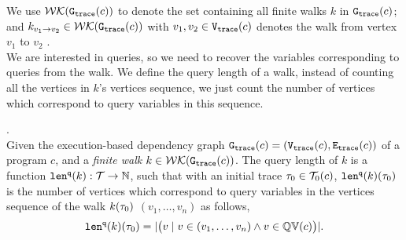 We use $\mathcal{WK}(\mathtt{{G_{trace}}}(c))$ to denote 
the set containing all finite walks $k$ in $\mathtt{{G_{trace}}}(c)$;
and $k_{v_1 \to v_2} \in \mathcal{WK}(\mathtt{{G_{trace}}}(c))$ with $v_1, v_2 \in \mathtt{{V_{trace}}}(c)$ denotes the walk from vertex $v_1$ to $v_2$ . 
\\
We are interested in queries, so we need to recover the 
variables corresponding to queries from the walk. We define the query length of a walk, 
instead of counting all 
the vertices in $k$'s vertices sequence, we just count the number of vertices which correspond to query variables in this sequence.
%
\begin{defn}.
\label{def:qlen}
\\
Given 
the execution-based dependency graph 
$\mathtt{{G_{trace}}}({c}) = (\mathtt{{V_{trace}}}({c}), \mathtt{{E_{trace}}}({c}))$ of a program $c$,
 and a \emph{finite walk} 
 $k \in \mathcal{WK}(\mathtt{{G_{trace}}}(c))$. 
The query length of $k$ is a function $\mathtt{len}^{\tt q}(k): \mathcal{T} \to \mathbb{N}$, such that with an initial trace  $\mathtt{\tau}_0 \in \mathcal{T}_0(c)$, $\mathtt{len}^{\tt q}(k)(\mathtt{\tau}_0)$ is
the number of vertices which correspond to query variables in the vertices sequence of the walk $k(\mathtt{\tau}_0)$
$(v_1, \ldots, v_{n})$ as follows, 
\[
  \mathtt{len}^{\tt q}(k)(\mathtt{\tau}_0) = |\big( v \mid v \in (v_1, \ldots, v_{n}) \land v \in \mathbb{QV}(c) \big)|.
\]
\end{defn}

